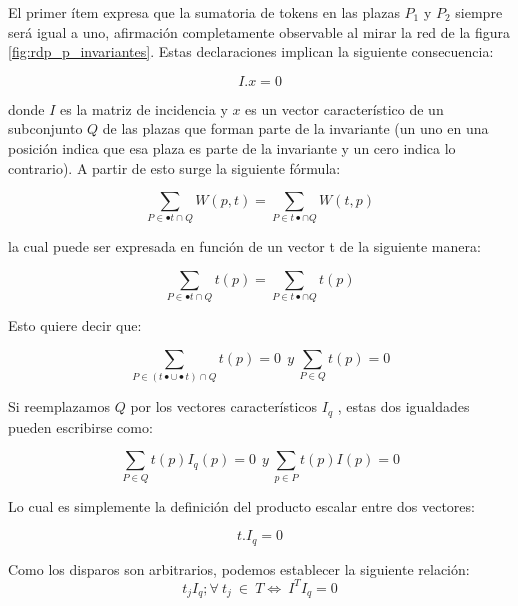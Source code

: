 El primer ítem expresa que la sumatoria de tokens en las plazas $P_1$ y $P_2$ siempre será igual a uno, afirmación completamente observable al mirar la red de la figura \ref{fig:rdp_p_invariantes}. Estas declaraciones implican la siguiente consecuencia:

\begin{equation}
   I . x = 0
\end{equation}

\noindent donde $I$ es la matriz de incidencia y $x$ es un vector característico de un subconjunto $Q$ de las plazas que forman parte de la invariante (un uno en una posición indica que esa plaza es parte de la invariante y un cero indica lo contrario). A partir de esto surge la siguiente fórmula:

\begin{equation}
    \sum_{P \in \bullet t \cap Q} W(p,t) = \sum_{P \in t \bullet \cap Q} W(t,p)
\end{equation}

\noindent la cual puede ser expresada en función de un vector t de la siguiente manera:

\begin{equation}
    \sum_{P \in \bullet t \cap Q} t(p) = \sum_{P \in t \bullet \cap Q} t(p)
\end{equation}

\noindent Esto quiere decir que:

\begin{equation}
    \sum_{P \in (t \bullet \cup \bullet t) \cap Q} t(p) = 0 \ \ y \  \sum_{P \in Q} t(p) = 0
\end{equation}

Si reemplazamos $Q$ por los vectores característicos $I_q$ , estas dos igualdades pueden escribirse como:

\begin{equation}
    \sum_{P \in Q} t(p) I_q(p) = 0 \ \ y \  \sum_{p \in P} t(p)I(p) = 0
\end{equation}

\noindent Lo cual es simplemente la definición del producto escalar entre dos vectores:

\begin{equation}
    t.I_q = 0
\end{equation}

\noindent Como los disparos son arbitrarios, podemos establecer la siguiente relación:
\begin{equation}
    t_j I_q; \forall \ t_j \ \in \ T \Longleftrightarrow \ I^T I_q = 0
\end{equation}

